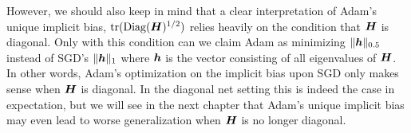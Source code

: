 

However, we should also keep in mind that a clear interpretation of Adam's unique implicit bias, $\text{tr}(\mathrm{Diag}({\bm{H}})^{1/2})$ relies heavily on the condition that ${\bm{H}}$ is diagonal. Only with this condition can we claim Adam as minimizing $\|{\bm{h}}\|_{0.5}$ instead of SGD's $\|{\bm{h}}\|_1$ where ${\bm{h}}$ is the vector consisting of all eigenvalues of ${\bm{H}}$. In other words, Adam's optimization on the implicit bias upon SGD only makes sense when ${\bm{H}}$ is diagonal. In the diagonal net setting this is indeed the case in expectation, but we will see in the next chapter that Adam's unique implicit bias may even lead to worse generalization when ${\bm{H}}$ is no longer diagonal.
